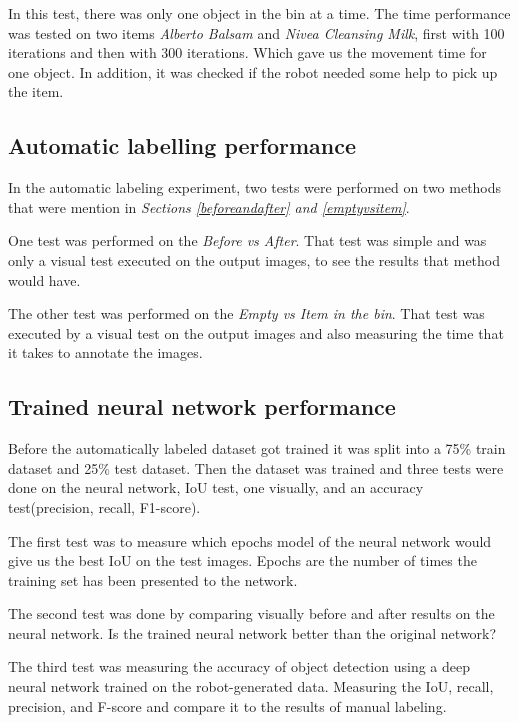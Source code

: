 In this test, there was only one object in the bin at a time. The time performance was tested on two items \textit{Alberto Balsam} and \textit{Nivea Cleansing Milk}, first with 100 iterations and then with 300 iterations. Which gave us the movement time for one object. In addition, it was checked if the robot needed some help to pick up the item.

\subsection{Automatic labelling performance}
In the automatic labeling experiment, two tests were performed on two methods that were mention in \textit{Sections \ref{beforeandafter} and \ref{emptyvsitem}}. 

One test was performed on the \textit{Before vs After}. That test was simple and was only a visual test executed on the output images, to see the results that method would have.

The other test was performed on the \textit{Empty vs Item in the bin}. That test was executed by a visual test on the output images and also measuring the time that it takes to annotate the images.

\subsection{Trained neural network performance}
Before the automatically labeled dataset got trained it was split into a 75\% train dataset and 25\% test dataset. Then the dataset was trained and three tests were done on the neural network, IoU test, one visually, and an accuracy test(precision, recall, F1-score).


The first test was to measure which epochs model of the neural network would give us the best IoU on the test images. Epochs are the number of times the training set has been presented to the network.

The second test was done by comparing visually before and after results on the neural network. Is the trained neural network better than the original network?

The third test was measuring the accuracy of object detection using a deep neural network trained on the robot-generated data. Measuring the IoU, recall, precision, and F-score and compare it to the results of manual labeling. 